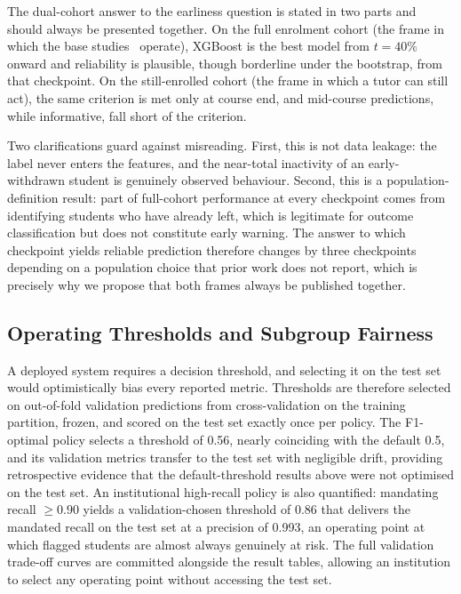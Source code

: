 \documentclass[conference]{IEEEtran}
\begin{document}
The dual-cohort answer to the earliness question is stated in two parts and
should always be presented together. On the full enrolment cohort (the frame
in which the base studies~\cite{tomasevic2020,adnan2021} operate), XGBoost
is the best model from $t=40\%$ onward and reliability is plausible, though
borderline under the bootstrap, from that checkpoint. On the still-enrolled
cohort (the frame in which a tutor can still act), the same criterion is met
only at course end, and mid-course predictions, while informative, fall
short of the criterion.

Two clarifications guard against misreading. First, this is not data
leakage: the label never enters the features, and the near-total inactivity
of an early-withdrawn student is genuinely observed behaviour. Second, this
is a population-definition result: part of full-cohort performance at every
checkpoint comes from identifying students who have already left, which is
legitimate for outcome classification but does not constitute early warning.
The answer to which checkpoint yields reliable prediction therefore changes
by three checkpoints depending on a population choice that prior work does
not report, which is precisely why we propose that both frames always be
published together.

\subsection{Operating Thresholds and Subgroup Fairness}

A deployed system requires a decision threshold, and selecting it on the
test set would optimistically bias every reported metric. Thresholds are
therefore selected on out-of-fold validation predictions from
cross-validation on the training partition, frozen, and scored on the test
set exactly once per policy. The F1-optimal policy selects a threshold of
0.56, nearly coinciding with the default 0.5, and its validation
metrics transfer to the test set with negligible drift, providing
retrospective evidence that the default-threshold results above were not
optimised on the test set. An institutional high-recall policy is also
quantified: mandating recall $\geq 0.90$ yields a validation-chosen
threshold of 0.86 that delivers the mandated recall on the test
set at a precision of 0.993, an operating point at
which flagged students are almost always genuinely at risk. The full
validation trade-off curves are committed alongside the result tables,
allowing an institution to select any operating point without accessing the
test set.
\end{document}
